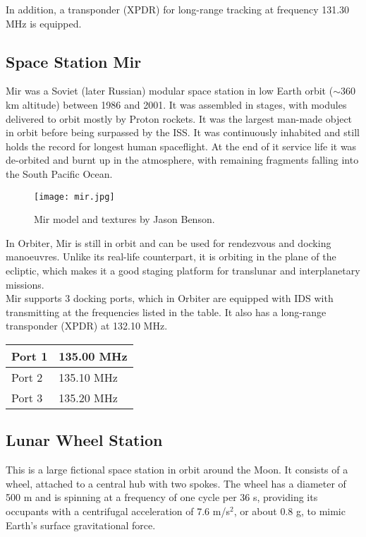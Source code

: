 \documentclass[Orbiter User Manual.tex]{subfiles}
\begin{document}
\noindent
In addition, a transponder (XPDR) for long-range tracking at frequency 131.30 MHz is equipped.


\subsection{Space Station Mir}
Mir was a Soviet (later Russian) modular space station in low Earth orbit ($\sim$360 km altitude) between 1986 and 2001. It was assembled in stages, with modules delivered to orbit mostly by Proton rockets. It was the largest man-made object in orbit before being surpassed by the ISS. It was continuously inhabited and still holds the record for longest human spaceflight. At the end of it service life it was de-orbited and burnt up in the atmosphere, with remaining fragments falling into the South Pacific Ocean.\\

\begin{figure}[H]
  \centering
  \texttt{[image: mir.jpg]}
  \caption{Mir model and textures by Jason Benson.}
\end{figure}

\noindent
In Orbiter, Mir is still in orbit and can be used for rendezvous and docking manoeuvres. Unlike its real-life counterpart, it is orbiting in the plane of the ecliptic, which makes it a good staging platform for translunar and interplanetary missions.\\
Mir supports 3 docking ports, which in Orbiter are equipped with IDS with transmitting at the frequencies listed in the table. It also has a long-range transponder (XPDR) at 132.10 MHz.

	\begin{longtable}{ |p{}|p{}| }
	\hline\rule{0pt}{2ex}
	Port 1 & 135.00  MHz\\
	\hline\rule{0pt}{2ex}
	Port 2 & 135.10  MHz\\
	\hline\rule{0pt}{2ex}
	Port 3 & 135.20  MHz\\
	\hline
	\end{longtable}


\subsection{Lunar Wheel Station}
This is a large fictional space station in orbit around the Moon. It consists of a wheel, attached to a central hub with two spokes. The wheel has a diameter of 500 m and is spinning at a frequency of one cycle per 36 s, providing its occupants with a centrifugal acceleration of 7.6 m/s$^{2}$, or about 0.8 g, to mimic Earth's surface gravitational force.
\end{document}
